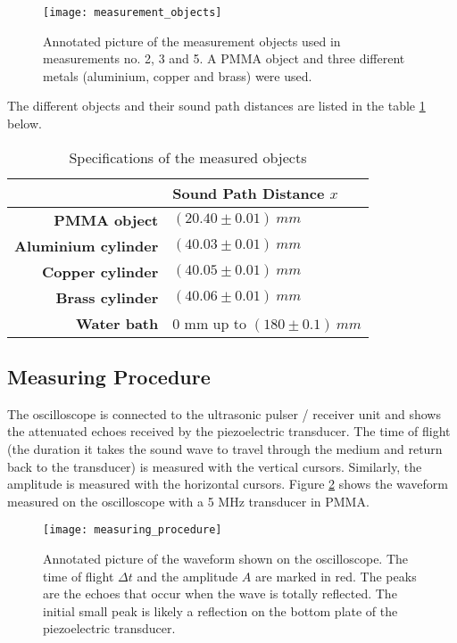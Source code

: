 \begin{figure}[H]
	\centering
	\texttt{[image: measurement\_objects]}
	\caption{Annotated picture of the measurement objects used in measurements no. 2, 3 and 5. A PMMA object and three different metals (aluminium, copper and brass) were used.}
	\label{fig:measurement_objects}
\end{figure}

The different objects and their sound path distances are listed in the table \ref{tab:sound_path_distance} below.

\begin{table}[H]
	\centering
	\renewcommand{\arraystretch}{1.2}
	\begin{tabular}{r|l}
		 & \textbf{Sound Path Distance $x$} \\
		\hline
		\textbf{PMMA object} & $(20.40 \pm 0.01)\ \si{mm}$ \\
		\textbf{Aluminium cylinder} & $(40.03 \pm 0.01)\ \si{mm}$ \\
		\textbf{Copper cylinder} & $(40.05 \pm 0.01)\ \si{mm}$ \\
		\textbf{Brass cylinder} & $(40.06 \pm 0.01)\ \si{mm}$ \\
		\textbf{Water bath} & 0 mm up to $(180 \pm 0.1)\ \si{mm}$ \\ \hline
	\end{tabular}
	\caption{Specifications of the measured objects}
	\label{tab:sound_path_distance}
\end{table}

\subsection{Measuring Procedure}
\label{subsec:measuring_procedure}
The oscilloscope is connected to the ultrasonic pulser / receiver unit and shows the attenuated echoes received by the piezoelectric transducer. The time of flight (the duration it takes the sound wave to travel through the medium and return back to the transducer) is measured with the vertical cursors. Similarly, the amplitude is measured with the horizontal cursors. Figure \ref{fig:measuring_procedure} shows the waveform measured on the oscilloscope with a 5 MHz transducer in PMMA.

\begin{figure}[H]
	\centering
	\texttt{[image: measuring\_procedure]}
	\caption{Annotated picture of the waveform shown on the oscilloscope. The time of flight $\Delta t$ and the amplitude $A$ are marked in red. The peaks are the echoes that occur when the wave is totally reflected. The initial small peak is likely a reflection on the bottom plate of the piezoelectric transducer.}
	\label{fig:measuring_procedure}
\end{figure}

